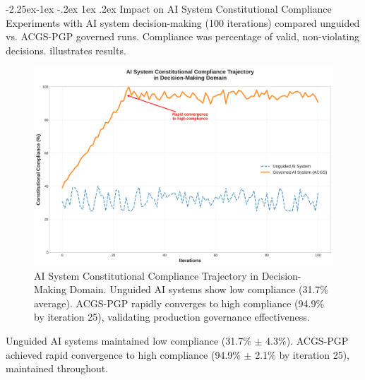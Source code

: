 \documentclass[manuscript,screen,9pt]{acmart}
\makeatletter
\renewcommand\subsection{\@startsection{subsection}{2}{\z@}%
  {-2.25ex\@plus -1ex \@minus -.2ex}%
  {1ex \@plus .2ex}%
  {\normalfont\large\bfseries}}
\makeatother
\begin{document}
\subsection{Impact on AI System Constitutional Compliance}
\label{subsec:impact_compliance}
Experiments with AI system decision-making (100 iterations) compared unguided vs. ACGS-PGP governed runs. Compliance was percentage of valid, non-violating decisions.  illustrates results.
\FloatBarrier %
\begin{figure}[!htb]
	\centering
	\includegraphics[width=\linewidth,keepaspectratio]{figures/Figure_4_Constitutional_Compliance_Over_Generations.png}
	\caption[AI System Constitutional Compliance Trajectory]{AI System Constitutional Compliance Trajectory in Decision-Making Domain. Unguided AI systems show low compliance (31.7\% average). ACGS-PGP rapidly converges to high compliance (94.9\% by iteration 25), validating production governance effectiveness.}
	\label{fig:compliance_over_generations}
\end{figure}
Unguided AI systems maintained low compliance (31.7\% $\pm$ 4.3\%). ACGS-PGP achieved rapid convergence to high compliance (94.9\% $\pm$ 2.1\% by iteration 25), maintained throughout.
\end{document}
